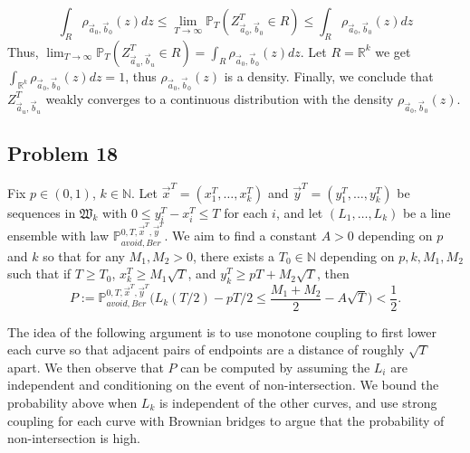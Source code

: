 \documentclass[12pt]{article}
\begin{document}
$$\int_{R}\rho_{\vec{a}_{0},\vec{b}_{0}}(z)dz \leqslant \lim_{T\rightarrow\infty}\mathbb{P}_{T}(Z^{T}_{\vec{a}_{0},\vec{b}_{0}}\in R)\leqslant\int_{R}\rho_{\vec{a}_{0},\vec{b}_{0}}(z)dz$$ Thus, $\lim_{T\rightarrow\infty}\mathbb{P}_{T}(Z^{T}_{\vec{a}_{u},\vec{b}_{u}}\in R)=\int_{R}\rho_{\vec{a}_{0},\vec{b}_{0}}(z)dz$. Let $R=\mathbb{R}^{k}$ we get $\int_{\mathbb{R}^{k}}\rho_{\vec{a}_{0},\vec{b}_{0}}(z)dz = 1$, thus $\rho_{\vec{a}_{0},\vec{b}_{0}}(z)$ is a density. Finally, we conclude that $Z^{T}_{\vec{a}_{u},\vec{b}_{u}}$ weakly converges to a continuous distribution with the density $\rho_{\vec{a}_{0},\vec{b}_{0}}(z)$.



\subsection*{Problem 18}

	Fix $p\in(0,1)$, $k\in\mathbb{N}$. Let $\vec{x}^T = (x_1^T,\dots,x_k^T)$ and $\vec{y}^T = (y_1^T,\dots,y_k^T)$ be sequences in $\mathfrak{W}_k$ with $0\leq y_i^T - x_i^T \leq T$ for each $i$, and let $(L_1,\dots,L_k)$ be a line ensemble with law $\mathbb{P}^{0,T,\vec{x}^T,\vec{y}^T}_{avoid, Ber}$.  We aim to find a constant $A>0$ depending on $p$ and $k$ so that for any $M_1, M_2 > 0$, there exists a $T_0 \in \mathbb{N}$ depending on $p,k,M_1,M_2$ such that if $T\geq T_0$, $x_k^T \geq M_1\sqrt{T}$, and $y_k^T \geq pT + M_2\sqrt{T}$, then
	\[
	P := \mathbb{P}^{0,T,\vec{x}^T,\vec{y}^T}_{avoid, Ber} \Big( L_k(T/2) - pT/2 \leq \frac{M_1+M_2}{2} - A\sqrt{T} \Big) < \frac{1}{2}.
	\]
	
	The idea of the following argument is to use monotone coupling to first lower each curve so that adjacent pairs of endpoints are a distance of roughly $\sqrt{T}$ apart. We then observe that $P$ can be computed by assuming the $L_i$ are independent and conditioning on the event of non-intersection. We bound the probability above when $L_k$ is independent of the other curves, and use strong coupling for each curve with Brownian bridges to argue that the probability of non-intersection is high.
	
\end{document}
